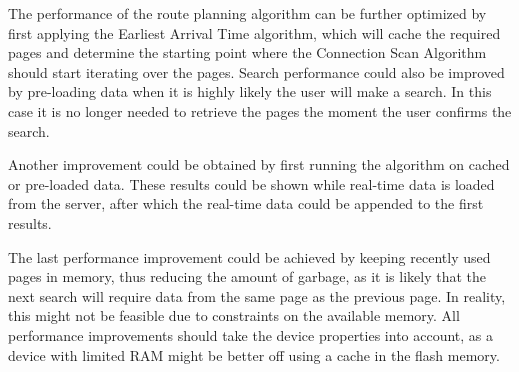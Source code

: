 \documentclass[twocolumn]{phdsymp} %
\begin{document}
The performance of the route planning algorithm can be further optimized by first applying the Earliest Arrival Time algorithm, which will cache the required pages and
determine the starting point where the Connection Scan Algorithm should start iterating over the pages. Search performance could also be improved by pre-loading data when it is highly likely the user will make a search. In this case it is no longer needed to retrieve the pages the moment the user confirms the search.

Another improvement could be obtained by first running the algorithm on cached or pre-loaded data. These results could be shown while real-time data is loaded from the
server, after which the real-time data could be appended to the first results.

The last performance improvement could be achieved by keeping recently used pages in memory, thus reducing the amount of garbage, as it is likely that the next search will
require data from the same page as the previous page. In reality, this might not be feasible due to constraints on the available memory. All performance improvements should take the device properties into account, as a device with limited RAM might be better off using a cache in the flash memory.

\nocite{*}

\end{document}
